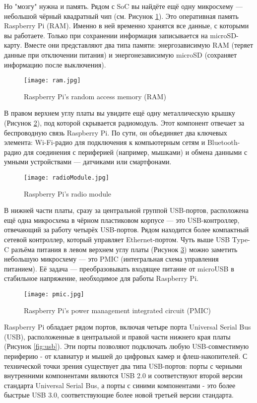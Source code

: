 Но "мозгу" нужна и память. Рядом с SoC вы найдёте ещё одну микросхему — небольшой чёрный квадратный чип (см. Рисунок \ref{fig:ram}). Это оперативная память Raspberry Pi (RAM). Именно в ней временно хранятся все данные, с которыми вы работаете. Только при сохранении информация записывается на microSD-карту. Вместе они представляют два типа памяти: энергозависимую RAM (теряет данные при отключении питания) и энергонезависимую microSD (сохраняет информацию после выключения).

\begin{figure}[H]
	\centering
	\texttt{[image: ram.jpg]}
	\caption{Raspberry Pi’s random access memory (RAM)}
	\label{fig:ram}
\end{figure}

В правом верхнем углу платы вы увидите ещё одну металлическую крышку (Рисунок \ref{fig:radio_module}), под которой скрывается радиомодуль. Этот компонент отвечает за беспроводную связь Raspberry Pi. По сути, он объединяет два ключевых элемента: Wi-Fi-радио для подключения к компьютерным сетям и Bluetooth-радио для соединения с периферией (например, мышками) и обмена данными с умными устройствами — датчиками или смартфонами.

\begin{figure}[H]
	\centering
	\texttt{[image: radioModule.jpg]}
	\caption{Raspberry Pi’s radio module}
	\label{fig:radio_module}
\end{figure}

В нижней части платы, сразу за центральной группой USB-портов, расположена ещё одна микросхема в чёрном пластиковом корпусе — это USB-контроллер, отвечающий за работу четырёх USB-портов. Рядом находится более компактный сетевой контроллер, который управляет Ethernet-портом. Чуть выше USB Type-C разъёма питания в левом верхнем углу платы (Рисунок \ref{fig:pmic}) можно заметить небольшую микросхему — это PMIC (интегральная схема управления питанием). Её задача — преобразовывать входящее питание от microUSB в стабильное напряжение, необходимое для работы Raspberry Pi.

\begin{figure}[H]
	\centering
	\texttt{[image: pmic.jpg]}
	\caption{Raspberry Pi’s power management integrated circuit (PMIC)}
	\label{fig:pmic}
\end{figure}

Raspberry Pi обладает рядом портов, включая четыре порта Universal Serial Bus (USB), расположенные в центральной и правой части нижнего края платы (Рисунок \ref{fig:usb}). Эти порты позволяют подключать любую USB-совместимую периферию - от клавиатур и мышей до цифровых камер и флеш-накопителей. С технической точки зрения существует два типа USB-портов: порты с черными внутренними компонентами являются USB 2.0 и соответствуют второй версии стандарта Universal Serial Bus, а порты с синими компонентами - это более быстрые USB 3.0, соответствующие более новой третьей версии стандарта.

